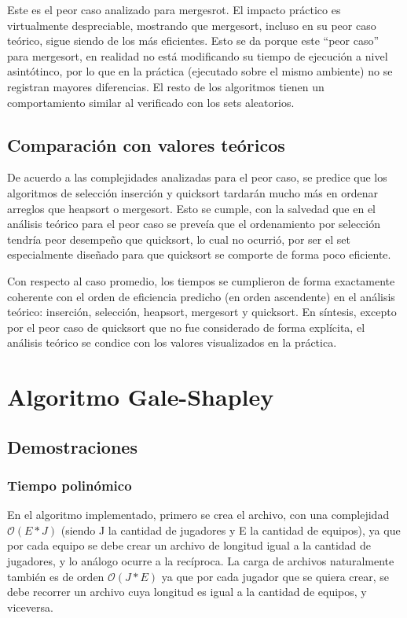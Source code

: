 \documentclass[article,a4paper]{article}
\newcommand{\bigO}{\mathcal{O}}
\begin{document}
Este es el peor caso analizado para mergesrot. El impacto práctico es virtualmente despreciable, mostrando que mergesort, incluso en su peor caso teórico, sigue siendo de los más eficientes. Esto se da porque este “peor caso” para mergesort, en realidad no está modificando su tiempo de ejecución a nivel asintótinco, por lo que en la práctica (ejecutado sobre el mismo ambiente) no se registran mayores diferencias. El resto de los algoritmos tienen un comportamiento similar al verificado con los sets aleatorios.

\subsection{Comparación con valores teóricos}

De acuerdo a las complejidades analizadas para el peor caso, se predice que los algoritmos de selección inserción y quicksort tardarán mucho más en ordenar arreglos que heapsort o mergesort. Esto se cumple, con la salvedad que en el análisis teórico para el peor caso se preveía que el ordenamiento por selección tendría peor desempeño que quicksort, lo cual no ocurrió, por ser el set especialmente diseñado para que quicksort se comporte de forma poco eficiente.

Con respecto al caso promedio, los tiempos se cumplieron de forma exactamente coherente con el orden de eficiencia predicho (en orden ascendente) en el análisis teórico: inserción, selección, heapsort, mergesort y quicksort. En síntesis, excepto por el peor caso de quicksort que no fue considerado de forma explícita, el análisis teórico se condice con los valores visualizados en la práctica.

\section{Algoritmo Gale-Shapley}

\subsection{Demostraciones}

\subsubsection{Tiempo polinómico}

En el algoritmo implementado, primero se crea el archivo, con una complejidad $\bigO(E*J)$ (siendo J la cantidad de jugadores y E la cantidad de equipos), ya que por cada equipo se debe crear un archivo de longitud igual a la cantidad de jugadores, y lo análogo ocurre a la recíproca. La carga de archivos  naturalmente también es de orden $\bigO(J*E)$ ya que por cada jugador que se quiera crear, se debe recorrer un archivo cuya longitud es igual a la cantidad de equipos, y viceversa.
\end{document}
